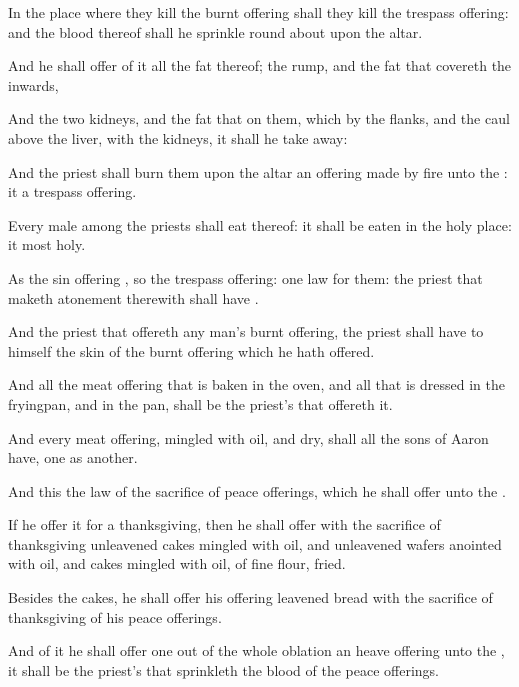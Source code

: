 {In the
place where they
kill the burnt
offering shall they
kill the trespass
offering: and the
blood thereof shall he
sprinkle round
about upon the
altar.

And he shall
offer of it all the
fat thereof; the
rump, and the
fat that
covereth the
inwards,

And the
two
kidneys, and the
fat that
{} on them, which
{} by the
flanks, and the
caul
{} above the
liver, with the
kidneys, it shall he take
away:

And the
priest shall
burn them upon the
altar
{} an offering made by
fire unto the
{}: it
{} a trespass
offering.

Every
male among the
priests shall
eat thereof: it shall be
eaten in the
holy
place: it
{}
most
holy.

As the sin
offering
{}, so
{} the trespass
offering:
{}
one
law for them: the
priest that maketh
atonement therewith shall have
{}.

And the
priest that
offereth any
man’s burnt
offering,
{} the
priest shall have to himself the
skin of the burnt
offering which he hath
offered.

And all the meat
offering that is
baken in the
oven, and all that is
dressed in the
fryingpan, and in the
pan, shall be the
priest’s that
offereth it.

And every meat
offering,
mingled with
oil, and
dry, shall all the
sons of
Aaron have,
one
{} as
another.


\par }{\PP {}And this
{} the
law of the
sacrifice of peace
offerings, which he shall
offer unto the
{}.

If he
offer it for a
thanksgiving, then he shall
offer with the
sacrifice of
thanksgiving
unleavened
cakes
mingled with
oil, and
unleavened
wafers
anointed with
oil, and
cakes
mingled with
oil, of fine
flour,
fried.

Besides the
cakes, he shall
offer
{} his
offering
leavened
bread with the
sacrifice of
thanksgiving of his peace
offerings.

And of it he shall
offer
one out of the whole
oblation
{} an heave
offering unto the
{},
{} it shall be the
priest’s that
sprinkleth the
blood of the peace
offerings.

}
